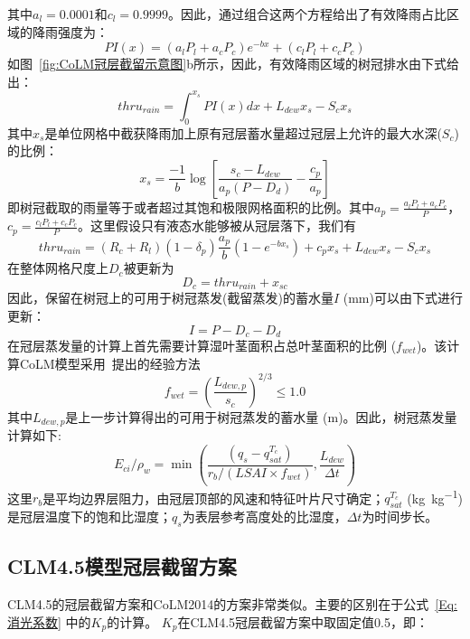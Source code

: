 其中$a_l=0.0001$和$c_l=0.9999$。因此，通过组合这两个方程给出了有效降雨占比区域的降雨强度为：
\begin{equation}
P I(x)=\left(a_{l} P_{l}+a_{c} P_{c}\right) e^{-b x}+\left(c_{l} P_{l}+c_{c} P_{c}\right)
\end{equation}
如图~\ref{fig:CoLM冠层截留示意图}b所示，因此，有效降雨区域的树冠排水由下式给出：
\begin{equation}
thru_{rain}=\int_{0}^{x_{s}} P I(x) d x+L_{dew} x_{s}-S_{c} x_{s}
\end{equation}
其中$x_s$是单位网格中截获降雨加上原有冠层蓄水量超过冠层上允许的最大水深($S_c$) 的比例：
\begin{equation}
x_{s}=\frac{-1}{b} \log \left[\frac{s_{c}-L_{d e w}}{a_{p}\left(P-D_{d}\right)}-\frac{c_{p}}{a_{p}}\right]
\end{equation}
即树冠截取的雨量等于或者超过其饱和极限网格面积的比例。其中$a_p=\frac{a_lP_l+a_cP_c}{P}$，$c_p=\frac{c_lP_l+c_cP_c}{P}$。这里假设只有液态水能够被从冠层落下，我们有
\begin{equation}
thru_{ {rain }}=\left(R_{c}+R_{l}\right)\left(1-\delta_{p}\right) \frac{a_{p}}{b}\left(1-e^{-b x_{s}}\right)+c_{p} x_{s}+L_{dew} x_{s}-S_{c} x_{s}
\end{equation}
在整体网格尺度上$D_c$被更新为
\begin{equation}
D_c=thru_{r a i n}+x_{s c}
\end{equation}
因此，保留在树冠上的可用于树冠蒸发(截留蒸发)的蓄水量$I$ (mm)可以由下式进行更新：
\begin{equation}
I={P}-D_{c}-D_{d}
\end{equation}
在冠层蒸发量的计算上首先需要计算湿叶茎面积占总叶茎面积的比例 ($f_{wet}$)。该计算CoLM模型采用~\citet{dickinson1993biosphere}提出的经验方法
\begin{equation}
f_{{wet}}=\left(\frac{L_{dew, p}}{s_{c}}\right)^{2 / 3} \leq 1.0
\end{equation}
其中$L_{dew, p}$是上一步计算得出的可用于树冠蒸发的蓄水量 (m)。因此，树冠蒸发量计算如下:
\begin{equation}
E_{ci} / \rho_{w}=\min \left(\frac{\left(q_{s}-q_{sat}^{T_{c}}\right)}{r_{b} /\left(LSAI \times f_{wet}\right)}, \frac{L_{dew}}{\Delta t}\right)
\end{equation}
这里$r_b$是平均边界层阻力，由冠层顶部的风速和特征叶片尺寸确定；$q_{sat}^{T_c}$ (\unit{kg.kg^{-1}}) 是冠层温度下的饱和比湿度；$q_s$为表层参考高度处的比湿度，$\Delta t$为时间步长。

\subsection{CLM4.5模型冠层截留方案}
CLM4.5的冠层截留方案和CoLM2014的方案非常类似。主要的区别在于公式~\eqref{Eq:消光系数} 中的$K_p$的计算。
$K_p$在CLM4.5冠层截留方案中取固定值0.5，即：

